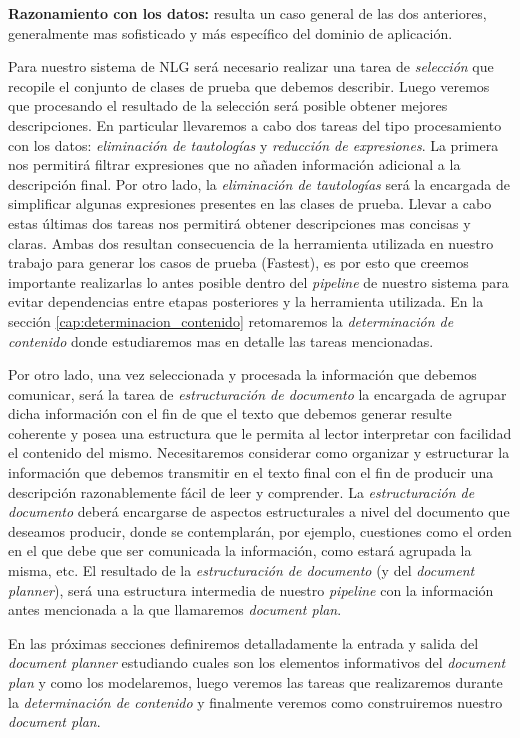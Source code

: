 \bigskip
\noindent
\textbf{Razonamiento con los datos:} resulta un caso general de las dos anteriores, generalmente mas sofisticado y más específico del dominio de aplicación. 

\bigskip
Para nuestro sistema de NLG será necesario realizar una tarea de \emph{selección} que recopile el conjunto de clases de prueba que debemos describir. Luego veremos que procesando el resultado de la selección será posible obtener mejores descripciones. En particular llevaremos a cabo dos tareas del tipo procesamiento con los datos: \emph{eliminación de tautologías} y \emph{reducción de expresiones}. La primera nos permitirá filtrar expresiones que no añaden información adicional a la descripción final. Por otro lado, la \emph{eliminación de tautologías} será la encargada de simplificar algunas expresiones presentes en las clases de prueba. Llevar a cabo estas últimas dos tareas nos permitirá obtener descripciones mas concisas y claras. Ambas dos resultan consecuencia de la herramienta utilizada en nuestro trabajo para generar los casos de prueba (Fastest), es por esto que creemos importante realizarlas lo antes posible dentro del \textit{pipeline} de nuestro sistema para evitar dependencias entre etapas posteriores y la herramienta utilizada. En la sección \ref{cap:determinacion_contenido} retomaremos la \emph{determinación de contenido} donde estudiaremos mas en detalle las tareas mencionadas.

Por otro lado, una vez seleccionada y procesada la información que debemos comunicar, será la tarea de \emph{estructuración de documento} la encargada de agrupar dicha información con el fin de que el texto que debemos generar resulte coherente y posea una estructura que le permita al lector interpretar con facilidad el contenido del mismo. Necesitaremos considerar como organizar y estructurar la información que debemos transmitir en el texto final con el fin de producir una descripción razonablemente fácil de leer y comprender. La \emph{estructuración de documento} deberá encargarse de aspectos estructurales a nivel del documento que deseamos producir, donde se contemplarán, por ejemplo, cuestiones como el orden en el que debe que ser comunicada la información, como estará agrupada la misma, etc. El resultado de la \emph{estructuración de documento} (y del \textit{document planner}), será una estructura intermedia de nuestro \textit{pipeline} con la información antes mencionada a la que llamaremos \emph{document plan}. 

En las próximas secciones definiremos detalladamente la entrada y salida del \textit{document planner} estudiando cuales son los elementos informativos del \emph{document plan} y como los modelaremos, luego veremos las tareas que realizaremos durante la \emph{determinación de contenido} y finalmente veremos como construiremos nuestro \textit{document plan}. 

